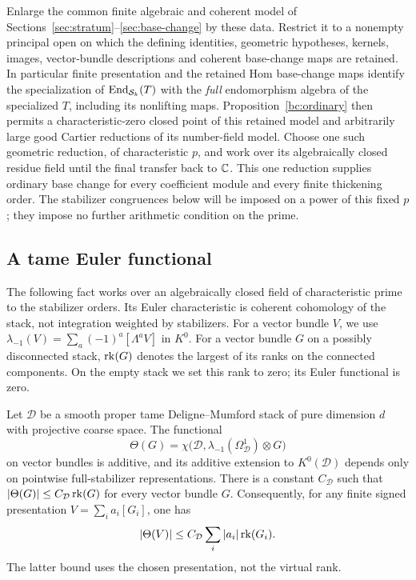 Enlarge the common finite algebraic and coherent model of
Sections~\ref{sec:stratum}--\ref{sec:base-change} by these data.  Restrict
it to a nonempty principal open on which the defining identities,
geometric hypotheses,
kernels, images, vector-bundle descriptions and coherent base-change
maps are retained.  In particular finite presentation and the retained
Hom base-change maps identify the specialization of
$\operatorname{End}_{\mathcal S_k}(T)$ with the \emph{full} endomorphism algebra of the
specialized $T$, including its nonlifting maps.  Proposition~\ref{bc:ordinary}
then permits a characteristic-zero closed point of this retained model
and arbitrarily large good Cartier reductions of its number-field model.
Choose one such geometric reduction, of characteristic $p$, and work
over its algebraically closed residue field until the final transfer
back to $\mathbb C$.  This one reduction supplies ordinary base change for
every coefficient module and every finite thickening order.  The
stabilizer congruences below will be imposed on a power of this fixed
$p$; they impose no further arithmetic condition on the prime.

\subsection{A tame Euler functional}

The following fact works over an algebraically closed field of
characteristic prime to the stabilizer orders.  Its Euler characteristic
is coherent cohomology of the stack, not integration weighted by
stabilizers.  For a vector bundle $V$, we use
$\lambda_{-1}(V)=\sum_a(-1)^a[\Lambda^aV]$ in $K^0$.
For a vector bundle $G$ on a possibly disconnected stack, $\operatorname{rk}(G)$
denotes the largest of its ranks on the connected components.  On the
empty stack we set this rank to zero; its Euler functional is zero.

\begin{lemma}\label{eu:tame-functional}
Let $\mathcal D$ be a smooth proper tame Deligne--Mumford stack of pure
dimension $d$ with projective coarse space.  The functional
\[
 \Theta(G)=\chi\bigl(\mathcal D,
                 \lambda_{-1}(\Omega^1_{\mathcal D})\otimes G\bigr)
\]
on vector bundles is additive, and its additive extension to
$K^0(\mathcal D)$ depends only on pointwise full-stabilizer
representations. There is a constant $C_{\mathcal D}$ such that
$|\Theta(G)|\le C_{\mathcal D}\operatorname{rk}(G)$ for every vector bundle $G$.
Consequently, for any finite signed presentation
$V=\sum_i a_i[G_i]$, one has
\[
       |\Theta(V)|\le C_{\mathcal D}\sum_i|a_i|\operatorname{rk}(G_i).
\]
The latter bound uses the chosen presentation, not the virtual rank.
\end{lemma}

